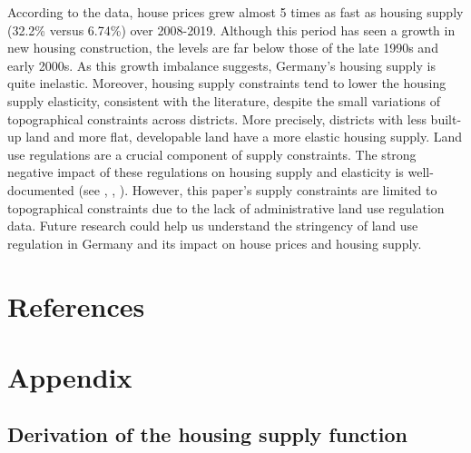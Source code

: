 \documentclass[
  12pt,
]{article}
\begin{document}
According to the data, house prices grew almost 5 times as fast as
housing supply (32.2\% versus 6.74\%) over 2008-2019. Although this
period has seen a growth in new housing construction, the levels are far
below those of the late 1990s and early 2000s. As this growth imbalance
suggests, Germany's housing supply is quite inelastic. Moreover, housing
supply constraints tend to lower the housing supply elasticity,
consistent with the literature, despite the small variations of
topographical constraints across districts. More precisely, districts
with less built-up land and more flat, developable land have a more
elastic housing supply. Land use regulations are a crucial component of
supply constraints. The strong negative impact of these regulations on
housing supply and elasticity is well-documented (see
\citet{glaeser_gyourko_2005}, \citet{saiz_2010},
\citet{baum-snow_han_2019}). However, this paper's supply constraints
are limited to topographical constraints due to the lack of
administrative land use regulation data. Future research could help us
understand the stringency of land use regulation in Germany and its
impact on house prices and housing supply.

\newpage

\section*{References}\label{references}

\renewcommand{\bibsection}{}



\newpage

\section*{Appendix}\label{sec-appendix-hse}

\setcounter{equation}{0}
\setcounter{figure}{0}
\setcounter{table}{0}
\setcounter{section}{1} %
\renewcommand\thesection{\Alph{section}}
\renewcommand\theequation{\thesection.\arabic{equation}}    
\renewcommand\thefigure{\thesection.\arabic{figure}}    
\renewcommand\thetable{\thesection.\arabic{table}}  

\subsection{Derivation of the housing supply
function}\label{sec-hs-appendix}
\end{document}
